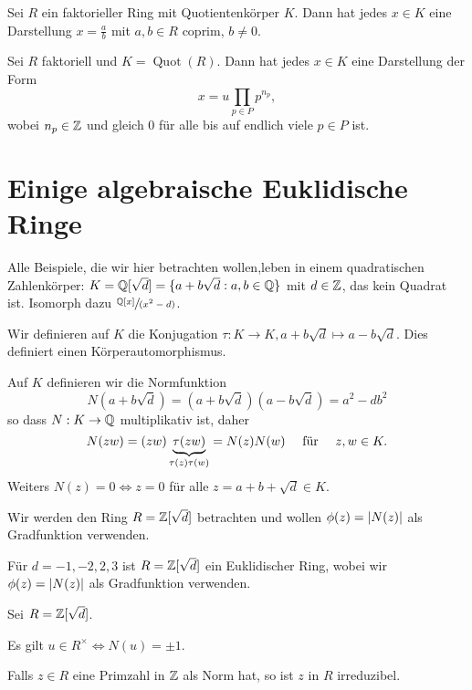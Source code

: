 \begin{corollary}
	Sei $R$ ein faktorieller Ring mit Quotientenkörper $K$.
	Dann hat jedes $x \in K$ eine Darstellung $x = \frac{a}{b}$ mit $a,b \in R$ coprim, $b \neq 0$.
\end{corollary}


\begin{corollary}
	Sei $R$ faktoriell und $K = \operatorname{Quot}(R)$. Dann hat jedes $x \in K$ eine Darstellung der Form 
	\[
	x = u \prod_{p \in P} p^{n_{p}}
	,\]
	wobei $n_{p} \in \mathbb{Z}$ und gleich $0$ für alle bis auf endlich viele $p \in P$ ist.
\end{corollary}


\section{Einige algebraische Euklidische Ringe}
Alle Beispiele, die wir hier betrachten wollen,leben in einem quadratischen Zahlenkörper:
$ K = \mathbb{Q}[\sqrt{d}] = \{a + b\sqrt{d} :a,b \in \mathbb{Q} \} $ mit $d \in \mathbb{Z}$, das kein Quadrat ist.
Isomorph dazu $\sfrac{\mathbb{Q}[x]}{(x^2-d)}$.

Wir definieren auf $K$ die Konjugation $\tau: K \to K, a+ b\sqrt{d} \mapsto a- b \sqrt{d}$.
Dies definiert einen Körperautomorphismus.



Auf $K$ definieren wir die Normfunktion
\[
	N(a+b \sqrt{d} ) = (a+b \sqrt{d} )(a-b \sqrt{d}) = a^2 - d b^2 
\]
so dass $N : K \to \mathbb{Q}$ multiplikativ ist, daher 
\[
	N(zw) = (zw) \underbrace{\tau(zw)}_{\tau(z) \tau(w)} = N(z) N(w) \qq{ für } z,w \in K
.\] 
Weiters $N(z) = 0 \Leftrightarrow z = 0$ für alle $z = a + b + \sqrt{d} \in K $.

Wir werden den Ring $R = \mathbb{Z}[\sqrt{d}]$ betrachten und wollen $\phi(z) = \abs{N(z)}$ als Gradfunktion verwenden.

\begin{theorem}
	Für $d = -1, -2, 2, 3$ ist  $R = \mathbb{Z}[\sqrt{d}]$ ein Euklidischer Ring, wobei wir $\phi(z) = \abs{N(z)}$ als Gradfunktion verwenden.
\end{theorem}


Sei $R = \mathbb{Z}[\sqrt{d}]$.
\begin{lemma}
	Es gilt $u \in R^{\times} \Leftrightarrow N(u) = \pm 1$.
\end{lemma}

\begin{lemma}
	Falls $z \in R$ eine Primzahl in $\mathbb{Z}$ als Norm hat, so ist $z$ in $R$ irreduzibel.
\end{lemma}

